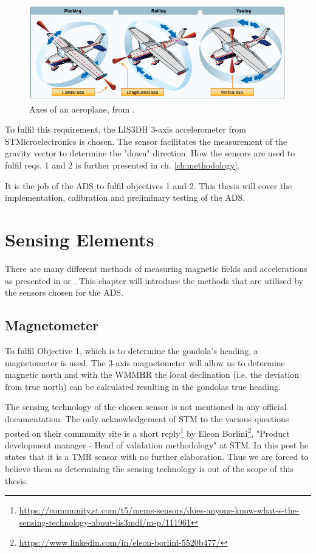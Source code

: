\begin{figure}[H]
    \centering
    \includegraphics[width=0.75\linewidth]{images/01_background/axes_of_an_airplane.png}
    \caption[Axes of an aeroplane]{Axes of an aeroplane, from \parencite{pilot-handbook}.}
    \label{fig:attitude}
\end{figure}


To fulfil this requirement, the LIS3DH 3-axis accelerometer from STMicroelectronics is chosen. The sensor facilitates the measurement of the gravity vector to determine the "down" direction. How the sensors are used to fulfil reqs. 1 and 2 is further presented in ch. \ref{ch:methodology}.

It is the job of the \ac{ADS} to fulfil objectives 1 and 2. This thesis will cover the implementation, calibration and preliminary testing of the \ac{ADS}.

\section{Sensing Elements \label{sec:bg:sensing_elements}}
There are many different methods of measuring magnetic fields and accelerations as presented in \parencite{space-based-magnetometers-review} or \parencite{quantum_accelerometers}. This chapter will introduce the methods that are utilised by the sensors chosen for the \ac{ADS}.

\subsection{Magnetometer \label{sec:bg:magnetometers}}
To fulfil Objective 1, which is to determine the gondola's heading, a magnetometer is used. The 3-axis magnetometer will allow us to determine magnetic north and with the \ac{WMMHR} the local declination (i.e. the deviation from true north) can be calculated resulting in the gondolas true heading. 

The sensing technology of the chosen sensor is not mentioned in any official documentation. The only acknowledgement of \ac{STM} to the various questions posted on their community site is a short reply\footnote{\url{https://community.st.com/t5/mems-sensors/does-anyone-know-what-s-the-sensing-technology-about-lis3mdl/m-p/111961}} by Eleon Borlini\footnote{\url{https://www.linkedin.com/in/eleon-borlini-5520b477/}}, "Product development manager - Head of validation methodology" at \ac{STM}. In this post he states that it is a \ac{TMR} sensor with no further elaboration. Thus we are forced to believe them as determining the sensing technology is out of the scope of this thesis.


